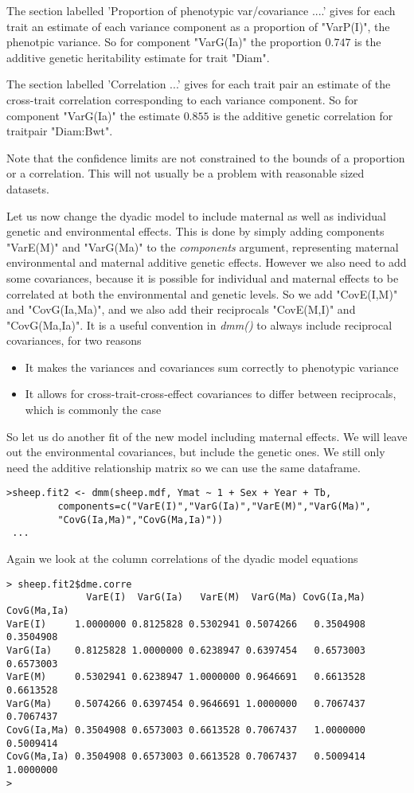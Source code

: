 \documentclass[titlepage]{article}  %
\begin{document}
 The section labelled 'Proportion of phenotypic var/covariance ....' gives for each trait an estimate of each variance component as a proportion of "VarP(I)", the phenotpic variance. So for component "VarG(Ia)" the proportion $0.747$ is the additive genetic heritability estimate for trait "Diam".

 The section labelled 'Correlation ...' gives for each trait pair an estimate of the cross-trait correlation corresponding to each variance component. So for component "VarG(Ia)" the estimate $0.855$ is the additive genetic correlation for traitpair "Diam:Bwt".

 Note that the confidence limits are not constrained to the bounds of a proportion or a correlation. This will not usually be a problem with reasonable sized datasets.

 Let us now change the dyadic model to include maternal as well as individual genetic and environmental effects. This is done by simply adding components "VarE(M)" and "VarG(Ma)" to the {\em components} argument, representing maternal environmental and maternal additive genetic effects. However we also need to add some covariances, because it is possible for individual and maternal effects to be correlated at both the environmental and genetic levels. So we add "CovE(I,M)" and "CovG(Ia,Ma)", and we also add their reciprocals "CovE(M,I)" and "CovG(Ma,Ia)". It is a useful convention in {\em dmm()} to always include reciprocal covariances, for two reasons
\begin{itemize}
\item It makes the variances and covariances sum correctly to phenotypic variance
\item It allows for cross-trait-cross-effect covariances to differ between reciprocals, which is commonly the case
\end{itemize}

 So let us do another fit of the new model including maternal effects. We will leave out the environmental covariances, but include the genetic ones. We still only need the additive relationship matrix so we can use the same dataframe.

\begin{verbatim}
>sheep.fit2 <- dmm(sheep.mdf, Ymat ~ 1 + Sex + Year + Tb,
         components=c("VarE(I)","VarG(Ia)","VarE(M)","VarG(Ma)",
         "CovG(Ia,Ma)","CovG(Ma,Ia)"))
 ...
\end{verbatim}
Again we look at the column correlations of the dyadic model equations
\begin{verbatim}
> sheep.fit2$dme.corre
              VarE(I)  VarG(Ia)   VarE(M)  VarG(Ma) CovG(Ia,Ma) CovG(Ma,Ia)
VarE(I)     1.0000000 0.8125828 0.5302941 0.5074266   0.3504908   0.3504908
VarG(Ia)    0.8125828 1.0000000 0.6238947 0.6397454   0.6573003   0.6573003
VarE(M)     0.5302941 0.6238947 1.0000000 0.9646691   0.6613528   0.6613528
VarG(Ma)    0.5074266 0.6397454 0.9646691 1.0000000   0.7067437   0.7067437
CovG(Ia,Ma) 0.3504908 0.6573003 0.6613528 0.7067437   1.0000000   0.5009414
CovG(Ma,Ia) 0.3504908 0.6573003 0.6613528 0.7067437   0.5009414   1.0000000
> 
\end{verbatim}
\end{document}
